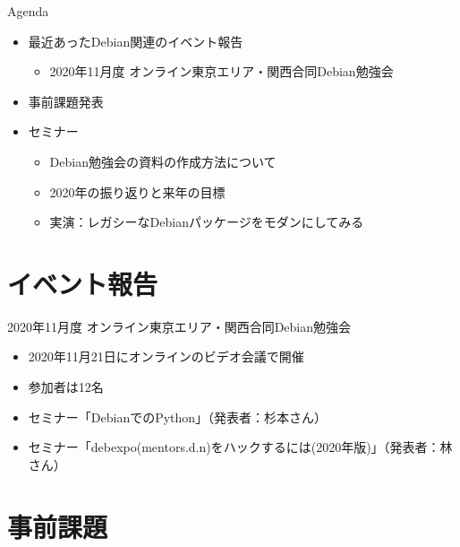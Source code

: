 \begin{frame}{Agenda}
 \begin{minipage}[t]{0.45\hsize}
  \begin{itemize}
  \item 最近あったDebian関連のイベント報告
    \begin{itemize}
    \item 2020年11月度 オンライン東京エリア・関西合同Debian勉強会
    \end{itemize}
  \item 事前課題発表
  \end{itemize}
 \end{minipage}
 \begin{minipage}[t]{0.45\hsize}
   \begin{itemize}
   \item セミナー
     \begin{itemize}
     \item Debian勉強会の資料の作成方法について
     \item 2020年の振り返りと来年の目標
     \item 実演：レガシーなDebianパッケージをモダンにしてみる
     \end{itemize}
  \end{itemize}
 \end{minipage}
\end{frame}

\section{イベント報告}

\begin{frame}{2020年11月度 オンライン東京エリア・関西合同Debian勉強会}
\begin{itemize}
\item 2020年11月21日にオンラインのビデオ会議で開催
\item 参加者は12名
\item セミナー「DebianでのPython」（発表者：杉本さん）
\item セミナー「debexpo(mentors.d.n)をハックするには(2020年版)」（発表者：林さん）
\end{itemize}
\end{frame}


\section{事前課題}

